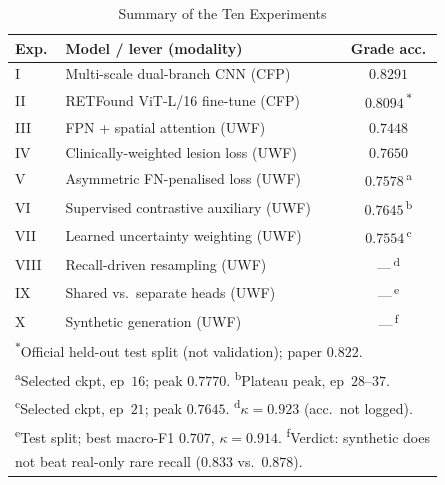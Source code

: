 \documentclass[journal,twoside,web]{ieeecolor}
\begin{document}
\begin{table}[!t]
\caption{Summary of the Ten Experiments}
\label{tab:overall}
\centering
\setlength{\tabcolsep}{3pt}
\begin{tabular}{|l|l|c|}
\hline
\textbf{Exp.} & \textbf{Model / lever (modality)} & \textbf{Grade acc.} \\
\hline
I & Multi-scale dual-branch CNN (CFP) & $0.8291$ \\
II & RETFound ViT-L/16 fine-tune (CFP) & $0.8094$\,\textsuperscript{$\ast$} \\
III & FPN + spatial attention (UWF) & $0.7448$ \\
IV & Clinically-weighted lesion loss (UWF) & $0.7650$ \\
V & Asymmetric FN-penalised loss (UWF) & $0.7578$\,\textsuperscript{a} \\
VI & Supervised contrastive auxiliary (UWF) & $0.7645$\,\textsuperscript{b} \\
VII & Learned uncertainty weighting (UWF) & $0.7554$\,\textsuperscript{c} \\
VIII & Recall-driven resampling (UWF) & ---\,\textsuperscript{d} \\
IX & Shared vs.\ separate heads (UWF) & ---\,\textsuperscript{e} \\
X & Synthetic generation (UWF) & ---\,\textsuperscript{f} \\
\hline
\multicolumn{3}{|l|}{\footnotesize \textsuperscript{$\ast$}Official held-out test
split (not validation); paper $0.822$.} \\
\multicolumn{3}{|l|}{\footnotesize \textsuperscript{a}Selected ckpt, ep~$16$; peak
$0.7770$. \textsuperscript{b}Plateau peak, ep~$28$--$37$.} \\
\multicolumn{3}{|l|}{\footnotesize \textsuperscript{c}Selected ckpt, ep~$21$; peak
$0.7645$. \textsuperscript{d}$\kappa=0.923$ (acc.\ not logged).} \\
\multicolumn{3}{|l|}{\footnotesize \textsuperscript{e}Test split; best macro-F1
$0.707$, $\kappa=0.914$. \textsuperscript{f}Verdict: synthetic does} \\
\multicolumn{3}{|l|}{\footnotesize not beat real-only rare recall ($0.833$ vs.\ $0.878$).} \\
\hline
\end{tabular}
\end{table}
\end{document}
